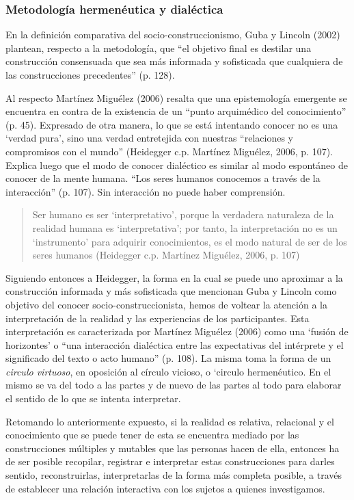 \subsubsection{Metodología hermenéutica y dialéctica}
En la definición comparativa del socio-construccionismo, Guba y Lincoln (2002)
plantean, respecto a la metodología, que “el objetivo final es destilar una
construcción consensuada que sea más informada y sofisticada que cualquiera de
las construcciones precedentes” (p. 128).

Al respecto Martínez Miguélez (2006) resalta que una epistemología emergente se
encuentra en contra de la existencia de un “punto arquimédico del conocimiento”
(p. 45).
Expresado de otra manera, lo que se está intentando conocer no es una ‘verdad
pura’, sino una verdad entretejida con nuestras “relaciones y compromisos con el
mundo” (Heidegger c.p. Martínez Miguélez, 2006, p. 107).
Explica luego que el modo de conocer dialéctico es similar al modo espontáneo de
conocer de la mente humana.
“Los seres humanos conocemos a través de la interacción” (p. 107).
Sin interacción no puede haber comprensión.

\begin{quote}
    Ser humano es ser ‘interpretativo’, porque la verdadera naturaleza de la
    realidad humana es ‘interpretativa’; por tanto, la interpretación no es un
    ‘instrumento’ para adquirir conocimientos, es el modo natural de ser de los
    seres humanos (Heidegger c.p. Martínez Miguélez, 2006, p. 107)
\end{quote}

Siguiendo entonces a Heidegger, la forma en la cual se puede uno aproximar a la
construcción informada y más sofisticada que mencionan Guba y Lincoln como
objetivo del conocer socio-construccionista, hemos de voltear la atención a la
interpretación de la realidad y las experiencias de los participantes.
Esta interpretación es caracterizada por Martínez Miguélez (2006) como una
‘fusión de horizontes’ o “una interacción dialéctica entre las expectativas del
intérprete y el significado del texto o acto humano” (p. 108).
La misma toma la forma de un \emph{circulo virtuoso}, en oposición al círculo
vicioso,
o ‘circulo hermenéutico.
En el mismo se va del todo a las partes y de nuevo de las partes al todo para
elaborar el sentido de lo que se intenta interpretar.

Retomando lo anteriormente expuesto, si la realidad es relativa, relacional y el
conocimiento que se puede tener de esta se encuentra mediado por las
construcciones múltiples y mutables que las personas hacen de ella, entonces ha
de ser posible recopilar, registrar e interpretar estas construcciones para
darles sentido, reconstruirlas, interpretarlas de la forma más completa posible,
a través de establecer una relación interactiva con los sujetos a quienes
investigamos.

